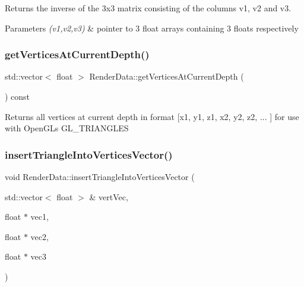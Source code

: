 \begin{DoxyReturn}{Returns}
the inverse of the 3x3 matrix consisting of the columns v1, v2 and v3. 
\end{DoxyReturn}

\begin{DoxyParams}{Parameters}
{\em (v1,v2,v3)} & pointer to 3 float arrays containing 3 floats respectively \\
\hline
\end{DoxyParams}
\mbox{\label{class_render_data_a2aff56e1742b853bcae6f251e258085e}} 
\subsubsection{\texorpdfstring{get\+Vertices\+At\+Current\+Depth()}{getVerticesAtCurrentDepth()}}
{\footnotesize\ttfamily std\+::vector$<$ float $>$ Render\+Data\+::get\+Vertices\+At\+Current\+Depth (\begin{DoxyParamCaption}{ }\end{DoxyParamCaption}) const}

\begin{DoxyReturn}{Returns}
all vertices at current depth in format \mbox{[}x1, y1, z1, x2, y2, z2, ... \mbox{]} for use with Open\+GL\textquotesingle{}s G\+L\+\_\+\+T\+R\+I\+A\+N\+G\+L\+ES 
\end{DoxyReturn}
\mbox{\label{class_render_data_a4fca77ce81a628de0ddaeb7d75a4c371}} 
\subsubsection{\texorpdfstring{insert\+Triangle\+Into\+Vertices\+Vector()}{insertTriangleIntoVerticesVector()}}
{\footnotesize\ttfamily void Render\+Data\+::insert\+Triangle\+Into\+Vertices\+Vector (\begin{DoxyParamCaption}\item[{std\+::vector$<$ float $>$ \&}]{vert\+Vec,  }\item[{float $\ast$}]{vec1,  }\item[{float $\ast$}]{vec2,  }\item[{float $\ast$}]{vec3 }\end{DoxyParamCaption})\hspace{0.3cm}{\ttfamily [private]}}

